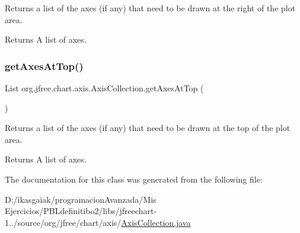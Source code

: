 Returns a list of the axes (if any) that need to be drawn at the right of the plot area.

\begin{DoxyReturn}{Returns}
A list of axes. 
\end{DoxyReturn}
\mbox{\label{classorg_1_1jfree_1_1chart_1_1axis_1_1_axis_collection_ac1857c2f5eb5f750d72f87756f81bea7}} 
\subsubsection{\texorpdfstring{get\+Axes\+At\+Top()}{getAxesAtTop()}}
{\footnotesize\ttfamily List org.\+jfree.\+chart.\+axis.\+Axis\+Collection.\+get\+Axes\+At\+Top (\begin{DoxyParamCaption}{ }\end{DoxyParamCaption})}

Returns a list of the axes (if any) that need to be drawn at the top of the plot area.

\begin{DoxyReturn}{Returns}
A list of axes. 
\end{DoxyReturn}


The documentation for this class was generated from the following file\+:\begin{DoxyCompactItemize}
\item 
D\+:/ikasgaiak/programacion\+Avanzada/\+Mis Ejercicios/\+P\+B\+Ldefinitibo2/libs/jfreechart-\/1../source/org/jfree/chart/axis/\mbox{\hyperlink{_axis_collection_8java}{Axis\+Collection.\+java}}\end{DoxyCompactItemize}

